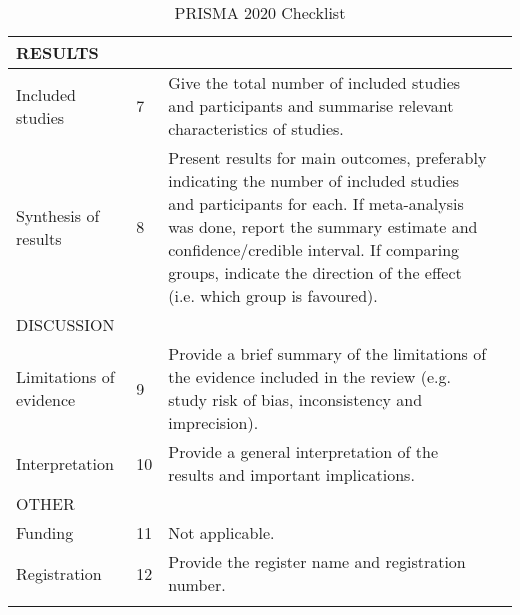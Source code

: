 \documentclass[landscape]{article}
\begin{document}
\begin{longtable}{|p{2.5cm}|p{0.5cm}|p{18cm}|p{3cm}|}
    \multicolumn{4}{l}{RESULTS} \\
    \hline
    Included studies & 7& Give the total number of included studies and participants and summarise relevant characteristics of studies.& \\
    \hline
    Synthesis of results & 8&Present results for main outcomes, preferably indicating the number of included studies and participants for each. If meta-analysis was done, report the summary estimate and confidence/credible interval. If comparing groups, indicate the direction of the effect (i.e. which group is favoured). & \\
    \hline \hline
    \multicolumn{4}{l}{DISCUSSION} \\
    \hline
    Limitations of evidence& 9 &Provide a brief summary of the limitations of the evidence included in the review (e.g. study risk of bias, inconsistency and imprecision). & \\
    \hline
    Interpretation&  10& Provide a general interpretation of the results and important implications.& \\
    \hline \hline
    \multicolumn{4}{l}{OTHER} \\
    \hline
    Funding& 11& Not applicable. & \\
    \hline
    Registration& 12& Provide the register name and registration number.& \\
    \hline
    \caption{PRISMA 2020 Checklist}
    \label{table:prisma_long}
\end{longtable}

\end{document}
